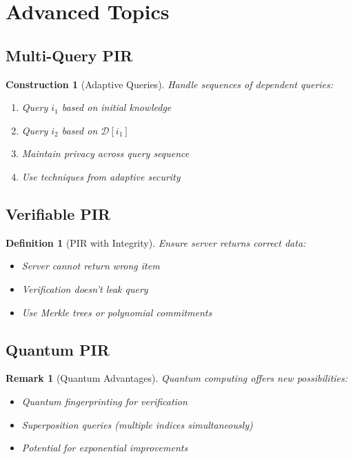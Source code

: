 \documentclass[11pt,final]{article}
\newcommand{\DB}{\mathcal{D}}
\newtheorem{definition}[theorem]{Definition}
\newtheorem{remark}[theorem]{Remark}
\newtheorem{construction}[theorem]{Construction}
\begin{document}
\section{Advanced Topics}

\subsection{Multi-Query PIR}

\begin{construction}[Adaptive Queries]
Handle sequences of dependent queries:
\begin{enumerate}
    \item Query $i_1$ based on initial knowledge
    \item Query $i_2$ based on $\DB[i_1]$
    \item Maintain privacy across query sequence
    \item Use techniques from adaptive security
\end{enumerate}
\end{construction}

\subsection{Verifiable PIR}

\begin{definition}[PIR with Integrity]
Ensure server returns correct data:
\begin{itemize}
    \item Server cannot return wrong item
    \item Verification doesn't leak query
    \item Use Merkle trees or polynomial commitments
\end{itemize}
\end{definition}

\subsection{Quantum PIR}

\begin{remark}[Quantum Advantages]
Quantum computing offers new possibilities:
\begin{itemize}
    \item Quantum fingerprinting for verification
    \item Superposition queries (multiple indices simultaneously)
    \item Potential for exponential improvements
\end{itemize}
\end{remark}
\end{document}
